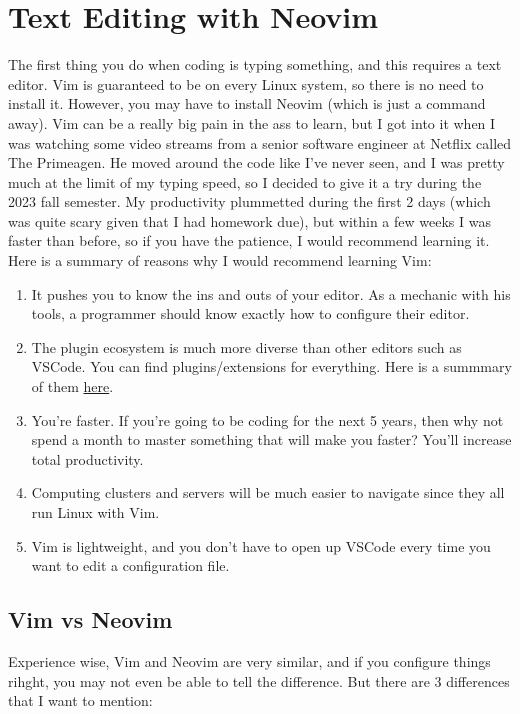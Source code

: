 \section{Text Editing with Neovim} 

  The first thing you do when coding is typing something, and this requires a text editor. Vim is guaranteed to be on every Linux system, so there is no need to install it. However, you may have to install Neovim (which is just a command away). Vim can be a really big pain in the ass to learn, but I got into it when I was watching some video streams from a senior software engineer at Netflix called The Primeagen. He moved around the code like I've never seen, and I was pretty much at the limit of my typing speed, so I decided to give it a try during the 2023 fall semester. My productivity plummetted during the first 2 days (which was quite scary given that I had homework due), but within a few weeks I was faster than before, so if you have the patience, I would recommend learning it. Here is a summary of reasons why I would recommend learning Vim: 
  \begin{enumerate}
    \item It pushes you to know the ins and outs of your editor. As a mechanic with his tools, a programmer should know exactly how to configure their editor.  
    \item The plugin ecosystem is much more diverse than other editors such as VSCode. You can find plugins/extensions for everything. Here is a summmary of them \href{https://github.com/rockerBOO/awesome-neovim\#neovim-lua-development}{here}. 
    \item You're faster. If you're going to be coding for the next 5 years, then why not spend a month to master something that will make you faster? You'll increase total productivity. 
    \item Computing clusters and servers will be much easier to navigate since they all run Linux with Vim. 
    \item Vim is lightweight, and you don't have to open up VSCode every time you want to edit a configuration file.  
  \end{enumerate}

\subsection{Vim vs Neovim}

  Experience wise, Vim and Neovim are very similar, and if you configure things rihght, you may not even be able to tell the difference. But there are 3 differences that I want to mention: 
  
